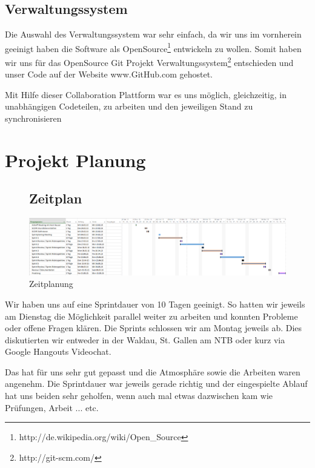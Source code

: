 \documentclass{article}
\begin{document}
\subsection{Verwaltungssystem}
Die Auswahl des Verwaltungssystem war sehr einfach, da wir uns im vornherein geeinigt haben die Software als OpenSource\footnote{http://de.wikipedia.org/wiki/Open\_Source} entwickeln zu wollen. Somit haben wir uns für das OpenSource Git Projekt Verwaltungssystem\footnote{http://git-scm.com/} entschieden und unser Code auf der Website www.GitHub.com gehostet.

Mit Hilfe dieser Collaboration Plattform war es uns möglich, gleichzeitig, in unabhängigen Codeteilen, zu arbeiten und den jeweiligen Stand zu synchronisieren

\newpage


\section{Projekt Planung}
\label{sec:projektplanung}
	\begin{figure}[h]
		\subsection{Zeitplan}
		\bigskip
		\begin{center}
			\centering
			\includegraphics[width=0.8\paperwidth]{PJPlanung}
			\caption{Zeitplanung}
		\end{center}
	\end{figure}	
	
Wir haben uns auf eine Sprintdauer von 10 Tagen geeinigt. So hatten wir jeweils am Dienstag die Möglichkeit parallel weiter zu arbeiten und konnten Probleme oder offene Fragen klären. Die Sprints schlossen wir am Montag jeweils ab. Dies diskutierten wir entweder in der Waldau, St. Gallen am NTB oder kurz via Google Hangouts Videochat.

Das hat für uns sehr gut gepasst und die Atmosphäre sowie die Arbeiten waren angenehm. Die Sprintdauer war jeweils gerade richtig und der eingespielte Ablauf hat uns beiden sehr geholfen, wenn auch mal etwas dazwischen kam wie Prüfungen, Arbeit ... etc.
	
\end{document}
